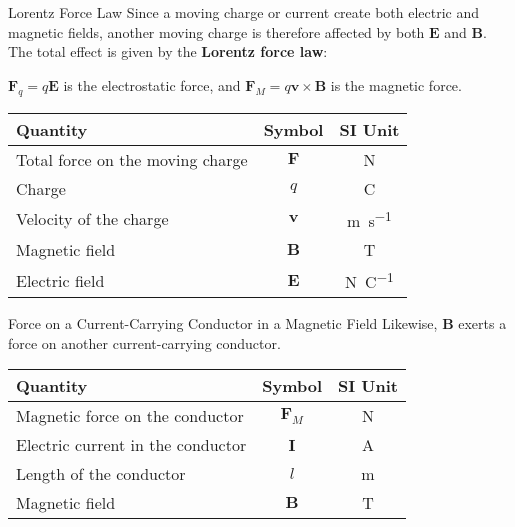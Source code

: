 \documentclass[12pt,aspectratio=169]{beamer}
\newcommand{\mb}[1]{\mathbf{#1}}
\newcommand{\eq}[2]{\vspace{#1}{\Large\begin{displaymath}#2\end{displaymath}}}
\begin{document}
\begin{frame}{Lorentz Force Law}
  Since a moving charge or current create both electric and magnetic fields,
  another moving charge is therefore affected by both $\mb{E}$ and $\mb{B}$.
  The total effect is given by the \textbf{Lorentz force law}:

  \eq{-.2in}{
    \boxed{\mb{F}=q(\mb{E}+\mb{v}\times\mb{B})}
  }

  \vspace{-.1in}$\mb{F}_q=q\mb{E}$ is the electrostatic force, and
  $\mb{F}_M=q\mb{v}\times\mb{B}$ is the magnetic force.
  \begin{center}
    \begin{tabular}{l|c|c}
      \rowcolor{pink}
      \textbf{Quantity} & \textbf{Symbol} & \textbf{SI Unit} \\ \hline
      Total force on the moving charge & $\mb{F}$ & \si{\newton} \\
      Charge                 & $q$      & \si{\coulomb} \\
      Velocity of the charge & $\mb{v}$ & \si{\metre\per\second} \\
      Magnetic field         & $\mb{B}$ & \si{\tesla} \\
      Electric field         & $\mb{E}$ & \si{\newton\per\coulomb}
    \end{tabular}
  \end{center}
\end{frame}



\begin{frame}{Force on a Current-Carrying Conductor in a Magnetic Field}
  Likewise, $\mb{B}$ exerts a force on another current-carrying conductor.

  \eq{-.2in}{
    \boxed{F_M=\mb{I}l\times\mb{B}}
  }
  \begin{center}
    \begin{tabular}{l|c|c}
      \rowcolor{pink}
      \textbf{Quantity} & \textbf{Symbol} & \textbf{SI Unit} \\ \hline
      Magnetic force on the conductor   & $\mb{F}_M$ & \si{\newton} \\
      Electric current in the conductor & $\mb{I}$   & \si{\ampere} \\
      Length of the conductor           & $l$        & \si{\metre} \\
      Magnetic field                    & $\mb{B}$   & \si{\tesla}
    \end{tabular}
  \end{center}
\end{frame}
\end{document}
